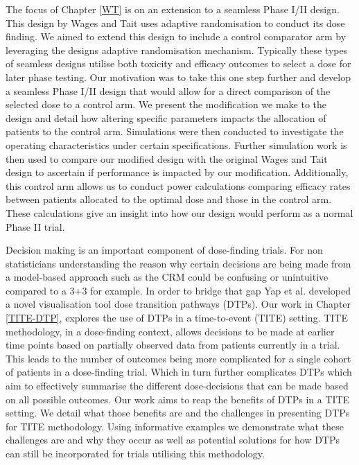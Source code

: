 The focus of Chapter \ref{WT} is on an extension to a seamless Phase \RN{1}/\RN{2} design. This design by Wages and Tait \cite{wagesSeamlessPhaseII2015} uses adaptive randomisation to conduct its dose finding. We aimed to extend this design to include a control comparator arm by leveraging the designs adaptive randomisation mechanism. Typically these types of seamless designs utilise both toxicity and efficacy outcomes to select a dose for later phase testing. Our motivation was to take this one step further and develop a seamless Phase \RN{1}/\RN{2} design that would allow for a direct comparison of the selected dose to a control arm. We present the modification we make to the design and detail how altering specific parameters impacts the allocation of patients to the control arm. Simulations were then conducted to investigate the operating characteristics under certain specifications. Further simulation work is then used to compare our modified design with the original Wages and Tait design to ascertain if performance is impacted by our modification. Additionally, this control arm allows us to conduct power calculations comparing efficacy rates between patients allocated to the optimal dose and those in the control arm. These calculations give an insight into how our design would perform as a normal Phase \RN{2} trial. 

Decision making is an important component of dose-finding trials. For non statisticians understanding the reason why certain decisions are being made from a model-based approach such as the CRM could be confusing or unintuitive compared to a 3+3 for example. In order to bridge that gap Yap et al. \cite{yapDoseTransitionPathways2017} developed a novel visualisation tool dose transition pathways (DTPs). Our work in Chapter \ref{TITE-DTP}, explores the use of DTPs in a time-to-event (TITE) setting. TITE methodology, in a dose-finding context, allows decisions to be made at earlier time points based on partially observed data from patients currently in a trial. This leads to the number of outcomes being more complicated for a single cohort of patients in a dose-finding trial. Which in turn further complicates DTPs which aim to effectively summarise the different dose-decisions that can be made based on all possible outcomes. Our work aims to reap the benefits of DTPs in a TITE setting. We detail what those benefits are and the challenges in presenting DTPs for TITE methodology. Using informative examples we demonstrate what these challenges are and why they occur as well as potential solutions for how DTPs can still be incorporated for trials utilising this methodology. 

